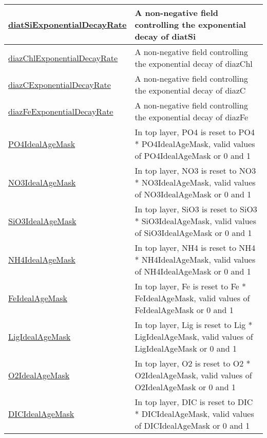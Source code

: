 {\begin{center}
\begin{longtable}{| p{2.0in} | p{4.0in} |}
    \hline
    \hyperref[subsec:var_sec_forcing_diatSiExponentialDecayRate]{diatSiExponentialDecayRate} & A non-negative field controlling the exponential decay of diatSi \\
    \hline
    \hyperref[subsec:var_sec_forcing_diazChlExponentialDecayRate]{diazChlExponentialDecayRate} & A non-negative field controlling the exponential decay of diazChl \\
    \hline
    \hyperref[subsec:var_sec_forcing_diazCExponentialDecayRate]{diazCExponentialDecayRate} & A non-negative field controlling the exponential decay of diazC \\
    \hline
    \hyperref[subsec:var_sec_forcing_diazFeExponentialDecayRate]{diazFeExponentialDecayRate} & A non-negative field controlling the exponential decay of diazFe \\
    \hline
    \hyperref[subsec:var_sec_forcing_PO4IdealAgeMask]{PO4IdealAgeMask} & In top layer, PO4 is reset to PO4 * PO4IdealAgeMask, valid values of PO4IdealAgeMask or 0 and 1 \\
    \hline
    \hyperref[subsec:var_sec_forcing_NO3IdealAgeMask]{NO3IdealAgeMask} & In top layer, NO3 is reset to NO3 * NO3IdealAgeMask, valid values of NO3IdealAgeMask or 0 and 1 \\
    \hline
    \hyperref[subsec:var_sec_forcing_SiO3IdealAgeMask]{SiO3IdealAgeMask} & In top layer, SiO3 is reset to SiO3 * SiO3IdealAgeMask, valid values of SiO3IdealAgeMask or 0 and 1 \\
    \hline
    \hyperref[subsec:var_sec_forcing_NH4IdealAgeMask]{NH4IdealAgeMask} & In top layer, NH4 is reset to NH4 * NH4IdealAgeMask, valid values of NH4IdealAgeMask or 0 and 1 \\
    \hline
    \hyperref[subsec:var_sec_forcing_FeIdealAgeMask]{FeIdealAgeMask} & In top layer, Fe is reset to Fe * FeIdealAgeMask, valid values of FeIdealAgeMask or 0 and 1 \\
    \hline
    \hyperref[subsec:var_sec_forcing_LigIdealAgeMask]{LigIdealAgeMask} & In top layer, Lig is reset to Lig * LigIdealAgeMask, valid values of LigIdealAgeMask or 0 and 1 \\
    \hline
    \hyperref[subsec:var_sec_forcing_O2IdealAgeMask]{O2IdealAgeMask} & In top layer, O2 is reset to O2 * O2IdealAgeMask, valid values of O2IdealAgeMask or 0 and 1 \\
    \hline
    \hyperref[subsec:var_sec_forcing_DICIdealAgeMask]{DICIdealAgeMask} & In top layer, DIC is reset to DIC * DICIdealAgeMask, valid values of DICIdealAgeMask or 0 and 1 \\

\end{longtable}
\end{center}}
